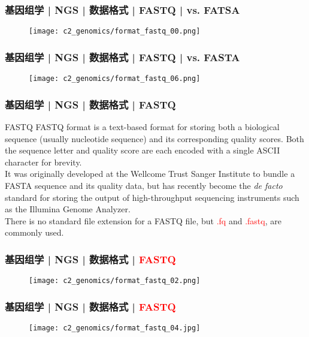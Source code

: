 \begin{frame}
  \frametitle{基因组学 | NGS | 数据格式 | FASTQ | vs. FATSA}
  \begin{figure}
    \centering
    \texttt{[image: c2\_genomics/format\_fastq\_00.png]}
  \end{figure}
\end{frame}

\begin{frame}
  \frametitle{基因组学 | NGS | 数据格式 | FASTQ | vs. FASTA}
  \begin{figure}
    \centering
    \texttt{[image: c2\_genomics/format\_fastq\_06.png]}
  \end{figure}
\end{frame}

\begin{frame}
  \frametitle{基因组学 | NGS | 数据格式 | FASTQ}
  \begin{block}{FASTQ}
FASTQ format is a text-based format for storing both a biological sequence (usually nucleotide sequence) and its corresponding quality scores. Both the sequence letter and quality score are each encoded with a single ASCII character for brevity.\\
\vspace{1em}
It was originally developed at the Wellcome Trust Sanger Institute to bundle a FASTA sequence and its quality data, but has recently become the \textit{de facto} standard for storing the output of high-throughput sequencing instruments such as the Illumina Genome Analyzer.\\
\vspace{1em}
There is no standard file extension for a FASTQ file, but \textcolor{red}{.fq} and \textcolor{red}{.fastq}, are commonly used.
  \end{block}
\end{frame}
    
\begin{frame}
  \frametitle{基因组学 | NGS | 数据格式 | \textcolor{red}{FASTQ}}
  \begin{figure}
    \centering
    \texttt{[image: c2\_genomics/format\_fastq\_02.png]}
  \end{figure}
\end{frame}
    
\begin{frame}
  \frametitle{基因组学 | NGS | 数据格式 | \textcolor{red}{FASTQ}}
  \begin{figure}
    \centering
    \texttt{[image: c2\_genomics/format\_fastq\_04.jpg]}
  \end{figure}
\end{frame}
    
